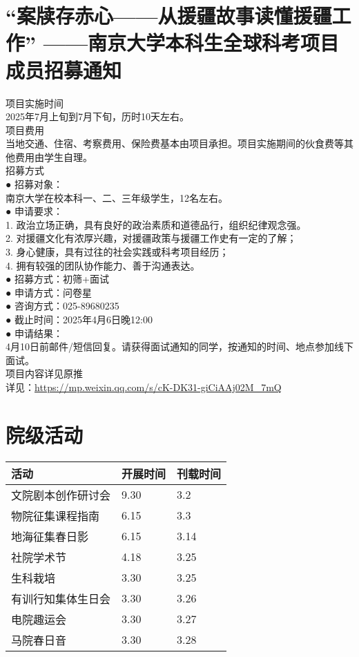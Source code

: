 \documentclass[letterpaper, 12pt]{article}
\begin{document}
\begin{multicols}{2}
\section{“案牍存赤心——从援疆故事读懂援疆工作” ——南京大学本科生全球科考项目成员招募通知}
项目实施时间
\\2025年7月上旬到7月下旬，历时10天左右。
\\项目费用
\\当地交通、住宿、考察费用、保险费基本由项目承担。项目实施期间的伙食费等其他费用由学生自理。
\\招募方式
\\● 招募对象：
\\南京大学在校本科一、二、三年级学生，12名左右。
\\● 申请要求：
\\1. 政治立场正确，具有良好的政治素质和道德品行，组织纪律观念强。
\\2. 对援疆文化有浓厚兴趣，对援疆政策与援疆工作史有一定的了解；
\\3. 身心健康，具有过往的社会实践或科考项目经历；
\\4. 拥有较强的团队协作能力、善于沟通表达。
\\● 招募方式：初筛+面试
\\● 申请方式：问卷星
\\● 咨询方式：025-89680235
\\● 截止时间：2025年4月6日晚12:00
\\● 申请结果：
\\4月10日前邮件/短信回复。请获得面试通知的同学，按通知的时间、地点参加线下面试。
\\项目内容详见原推
\\详见：\url{https://mp.weixin.qq.com/s/cK-DK31-giCiAAj02M_7mQ}


\section{院级活动}
\begin{tabular}{|>{\centering\arraybackslash}m{}|m{}|m{}|}
\hline
    活动 & 开展时间 & 刊载时间\\
    \hline\hline
    文院剧本创作研讨会 & 9.30 & 3.2\\
    物院征集课程指南 & 6.15 & 3.3\\
    地海征集春日影 & 6.15 & 3.14\\
    社院学术节 & 4.18 & 3.25\\
    生科栽培 & 3.30 & 3.25\\
    有训行知集体生日会 & 3.30 & 3.26\\
    电院趣运会 & 3.30 & 3.27\\
    马院春日音 & 3.30 & 3.28\\
    

\end{tabular}
\end{multicols}
\end{document}
